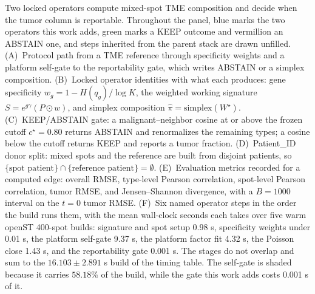 Two locked operators compute mixed-spot TME composition and decide when the tumor column is reportable. Throughout the panel, blue marks the two operators this work adds, green marks a KEEP outcome and vermillion an ABSTAIN one, and steps inherited from the parent stack are drawn unfilled. (A)~Protocol path from a TME reference through specificity weights and a platform self-gate to the reportability gate, which writes ABSTAIN or a simplex composition. (B)~Locked operator identities with what each produces: gene specificity \(w_g=1-H(q_g)/\log K\), the weighted working signature \(S=e^{g\hat\gamma}(P\odot w)\), and simplex composition \(\hat\pi=\mathrm{simplex}(W^\star)\). (C)~KEEP/ABSTAIN gate: a malignant--neighbor cosine at or above the frozen cutoff \(c^\star=0.80\) returns ABSTAIN and renormalizes the remaining types; a cosine below the cutoff returns KEEP and reports a tumor fraction. (D)~Patient\_ID donor split: mixed spots and the reference are built from disjoint patients, so \(\{\text{spot patient}\}\cap\{\text{reference patient}\}=\emptyset\). (E)~Evaluation metrics recorded for a computed edge: overall RMSE, type-level Pearson correlation, spot-level Pearson correlation, tumor RMSE, and Jensen--Shannon divergence, with a \(B=1000\) interval on the \(t=0\) tumor RMSE. (F)~Six named operator steps in the order the build runs them, with the mean wall-clock seconds each takes over five warm openST 400-spot builds: signature and spot setup 0.98 s, specificity weights under 0.01 s, the platform self-gate 9.37 s, the platform factor fit 4.32 s, the Poisson close 1.43 s, and the reportability gate 0.001 s. The stages do not overlap and sum to the \(16.103\pm2.891\) s build of the timing table. The self-gate is shaded because it carries \(58.18\%\) of the build, while the gate this work adds costs 0.001 s of it.
